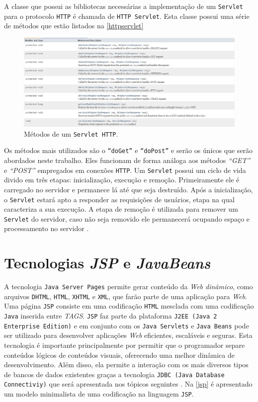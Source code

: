A classe que possui as bibliotecas necessárias a implementação de um \texttt{Servlet} para o protocolo \texttt{HTTP} é chamada de \texttt{HTTP Servlet}. 
Esta classe possui uma série de métodos que estão listados na \autoref{httpservlet}

\begin{figure}[h]
	\centering
	\caption{\label{httpservlet}Métodos de um \texttt{Servlet HTTP}.}
		\includegraphics[keepaspectratio=true,scale=0.5]{figuras/httpservlet.eps}
\end{figure}

Os métodos mais utilizados são o \texttt{“doGet”} e \texttt{“doPost”} e serão os únicos que serão abordados neste trabalho. 
Eles funcionam de forma análoga aos métodos \textit{“GET”} e \textit{“POST”} empregados em conexões \texttt{HTTP}.
Um \texttt{Servlet} possui um ciclo de vida divido em três etapas: inicialização, execução e remoção. 
Primeiramente ele é carregado no servidor e permanece lá até que seja destruído. Após a inicialização, 
o \texttt{Servlet} estará apto a responder as requisições de usuários, etapa na qual caracteriza a sua execução. 
A etapa de remoção é utilizada para remover um \texttt{Servlet} do servidor, caso não seja removido ele permanecerá ocupando
espaço e processamento no servidor \cite[p.~21]{barale}.

\section{Tecnologias \textit{JSP} e \textit{JavaBeans}}

A tecnologia \texttt{Java Server Pages} permite gerar conteúdo da \textit{Web dinâmico}, como arquivos \texttt{DHTML}, \texttt{HTML}, \texttt{XHTML} e \texttt{XML}, que 
farão parte de uma aplicação para \textit{Web}. Uma página \texttt{JSP} consiste em uma codificação \texttt{HTML} mesclada com uma codificação 
\texttt{Java} inserida entre \textit{TAGS}. \texttt{JSP} faz parte da plataforma \texttt{J2EE (Java 2 Enterprise Edition)} e em conjunto com os \texttt{Java Servlets}
e \texttt{Java Beans} pode ser utilizado para desenvolver aplicações \textit{Web} eficientes, escaláveis e seguras. Esta tecnologia é importante 
principalmente por permitir que o programador separe conteúdos lógicos de conteúdos visuais, oferecendo uma melhor dinâmica de 
desenvolvimento. Além disso, ela permite a interação com os mais diversos tipos de bancos de dados existentes graças a 
tecnologia \texttt{JDBC (Java Database Connectiviy)} que será apresentada nos tópicos seguintes \cite[p.~3]{paulojsp}. Na \autoref{jsp} é apresentado um modelo 
minimalista de uma codificação na linguagem \texttt{JSP}.

